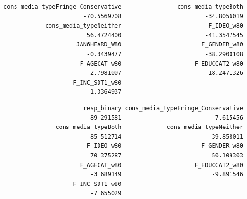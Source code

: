 \documentclass[
  letterpaper,
  DIV=11,
  numbers=noendperiod]{scrartcl}
\newenvironment{Shaded}{\begin{snugshade}}{\end{snugshade}}
\newcommand{\CommentTok}[1]{\textcolor[rgb]{0.37,0.37,0.37}{#1}}
\newcommand{\DecValTok}[1]{\textcolor[rgb]{0.68,0.00,0.00}{#1}}
\newcommand{\FunctionTok}[1]{\textcolor[rgb]{0.28,0.35,0.67}{#1}}
\newcommand{\NormalTok}[1]{\textcolor[rgb]{0.00,0.23,0.31}{#1}}
\newcommand{\SpecialCharTok}[1]{\textcolor[rgb]{0.37,0.37,0.37}{#1}}
\begin{document}
\begin{Shaded}
\end{Shaded}

\begin{verbatim}
cons_media_typeFringe_Conservative                cons_media_typeBoth 
                       -70.5569708                        -34.8056019 
            cons_media_typeNeither                         F_IDEO_w80 
                        56.4724400                        -41.3547545 
                     JAN6HEARD_W80                       F_GENDER_w80 
                        -0.3439477                        -38.2900108 
                      F_AGECAT_w80                     F_EDUCCAT2_w80 
                        -2.7981007                         18.2471326 
                    F_INC_SDT1_w80 
                        -1.3364937 
\end{verbatim}

\begin{Shaded}
\end{Shaded}

\begin{verbatim}
                       resp_binary cons_media_typeFringe_Conservative 
                        -89.291581                           7.615456 
               cons_media_typeBoth             cons_media_typeNeither 
                         85.512714                         -39.858011 
                        F_IDEO_w80                       F_GENDER_w80 
                         70.375287                          50.109303 
                      F_AGECAT_w80                     F_EDUCCAT2_w80 
                         -3.689149                          -9.891546 
                    F_INC_SDT1_w80 
                         -7.655029 
\end{verbatim}
\end{document}

